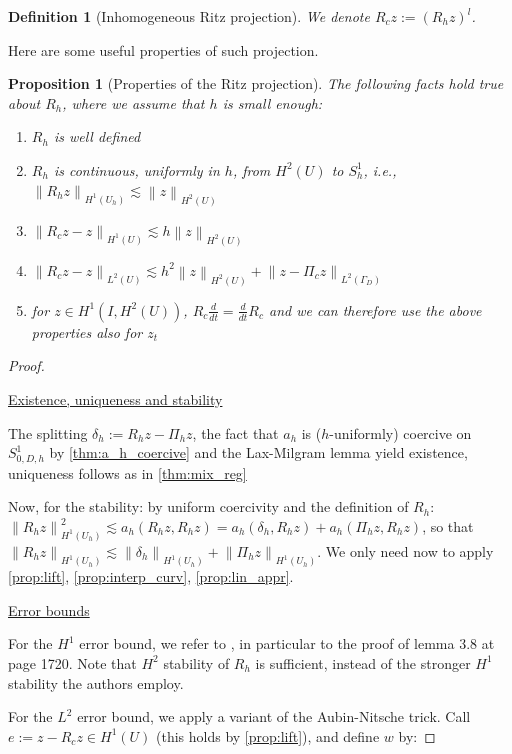 \documentclass[english,a4paper,9pt,oneside]{scrbook}	%
\theoremstyle{break}
\newtheorem{defn}[equation]{Definition}
\newtheorem{prop}[equation]{Proposition}
\newenvironment{mproof}[1][\proofname]{%
  \begin{proof}[#1]$ $\par\nobreak\ignorespaces
}{%
  \end{proof}
}
\renewcommand*{\proofname}{Proof}
\theoremstyle{remark}
\newcommand{\norm}[1]{\left\lVert#1\right\rVert}
\begin{document}
\begin{appendices}
\begin{defn}[Inhomogeneous Ritz projection]
We denote $R_c z := (R_h z)^l$.

\end{defn}

Here are some useful properties of such projection.

\begin{prop}[Properties of the Ritz projection]
\label{prop:ritz}
The following facts hold true about $R_h$, where we assume that $h$ is small enough:

\begin{enumerate}
	\item $R_h$ is well defined
	\item $R_h$ is continuous, uniformly in $h$, from $H^2(U)$ to $S^1_h$, i.e., $\norm{R_hz}_{H^1(U_h)}\lesssim \norm{z}_{H^2(U)}$
	\item $\norm{R_c z - z}_{H^1(U)}\lesssim h\norm{z}_{H^2(U)}$
	\item $\norm{R_c z - z}_{L^2(U)}\lesssim h^2 \norm{z}_{H^2(U)} + \norm{z-\Pi_c z}_{L^2(\Gamma_D)}$
	\item for $z \in H^1(I,H^2(U))$, $R_c \frac{d}{dt} = \frac{d}{dt} R_c$ and we can therefore use the above properties also for $z_t$
\end{enumerate}

\end{prop}

\begin{mproof}

\underline{Existence, uniqueness and stability}

The splitting $\delta_h := R_h z - \Pi_h z$, the fact that $a_h$ is ($h$-uniformly) coercive on $S^1_{0,D,h}$ by \cref{thm:a_h_coercive} and the Lax-Milgram lemma yield existence, uniqueness follows as in \cref{thm:mix_reg}

Now, for the stability: by uniform coercivity and the definition of $R_h$: $\norm{R_h z}_{H^1(U_h)}^2 \lesssim a_h(R_h z, R_h z) = a_h(\delta_h,R_h z) + a_h(\Pi_h z, R_h z)$, so that $\norm{R_h z}_{H^1(U_h)} \lesssim \norm{\delta_h }_{H^1(U_h)} + \norm{\Pi_h z }_{H^1(U_h)}$. We only need now to apply \cref{prop:lift}, \cref{prop:interp_curv}, \cref{prop:lin_appr}.

\underline{Error bounds}

For the $H^1$ error bound, we refer to \cite{ranner}, in particular to the proof of lemma 3.8 at page 1720. Note that $H^2$ stability of $R_h$ is sufficient, instead of the stronger $H^1$ stability the authors employ.

For the $L^2$ error bound, we apply a variant of the Aubin-Nitsche trick. Call $e:= z - R_c z \in H^1(U)$ (this holds by \cref{prop:lift}), and define $w$ by:


\end{mproof}
\end{appendices}
\end{document}
